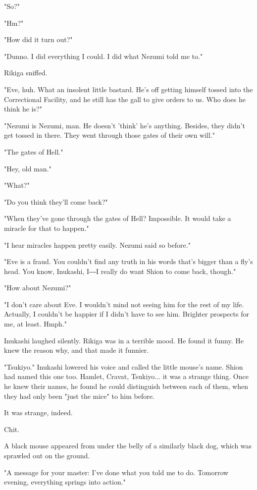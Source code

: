 "So?"

"Hm?"

"How did it turn out?"

"Dunno. I did everything I could. I did what Nezumi told me to."

Rikiga sniffed.

"Eve, huh. What an insolent little bastard. He's off getting himself
tossed into the Correctional Facility, and he still has the gall to give
orders to us. Who does he think he is?"

"Nezumi is Nezumi, man. He doesn't 'think' he's anything. Besides, they
didn't get tossed in there. They went through those gates of their own
will."

"The gates of Hell."

"Hey, old man."

"What?"

"Do you think they'll come back?"

"When they've gone through the gates of Hell? Impossible. It would take
a miracle for that to happen."

"I hear miracles happen pretty easily. Nezumi said so before."

"Eve is a fraud. You couldn't find any truth in his words that's bigger
than a fly's head. You know, Inukashi, I―I really do want Shion to come
back, though."

"How about Nezumi?"

"I don't care about Eve. I wouldn't mind not seeing him for the rest of
my life. Actually, I couldn't be happier if I didn't have to see him.
Brighter prospects for me, at least. Hmph."

Inukashi laughed silently. Rikiga was in a terrible mood. He found it
funny. He knew the reason why, and that made it funnier.

"Tsukiyo." Inukashi lowered his voice and called the little mouse's
name. Shion had named this one too. Hamlet, Cravat, Tsukiyo... it was a
strange thing. Once he knew their names, he found he could distinguish
between each of them, when they had only been "just the mice" to him
before.

It was strange, indeed.

Chit.

A black mouse appeared from under the belly of a similarly black dog,
which was sprawled out on the ground.

"A message for your master: I've done what you told me to do. Tomorrow
evening, everything springs into action."

